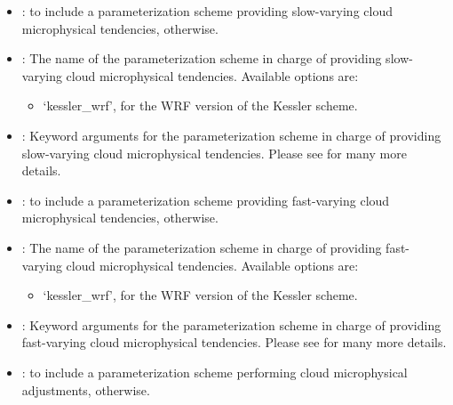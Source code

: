 \documentclass[letterpaper,10pt,english]{sphinxmanual}
\begin{document}
\begin{description}
\begin{itemize}
\item {} 
:  to include a parameterization scheme              providing slow-varying cloud microphysical tendencies,  otherwise.

\item {} 
: The name of the parameterization scheme in charge of                providing slow-varying cloud microphysical tendencies. Available options are:
\begin{itemize}
\item {} 
‘kessler\_wrf’, for the WRF version of the Kessler scheme.

\end{itemize}

\item {} 
: Keyword arguments for the parameterization scheme                 in charge of providing slow-varying cloud microphysical tendencies. Please see           for many more details.

\item {} 
:  to include a parameterization scheme              providing fast-varying cloud microphysical tendencies,  otherwise.

\item {} 
: The name of the parameterization scheme in charge of                providing fast-varying cloud microphysical tendencies. Available options are:
\begin{itemize}
\item {} 
‘kessler\_wrf’, for the WRF version of the Kessler scheme.

\end{itemize}

\item {} 
: Keyword arguments for the parameterization scheme                 in charge of providing fast-varying cloud microphysical tendencies. Please see           for many more details.

\item {} 
:  to include a parameterization scheme                 performing cloud microphysical adjustments,  otherwise.


\end{itemize}
\end{description}
\end{document}
